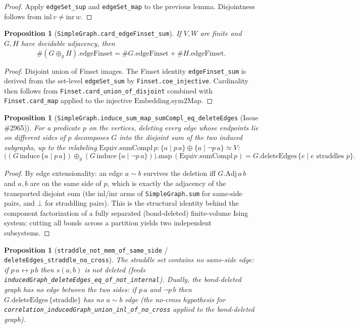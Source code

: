 \documentclass[a4paper,11pt]{article}
\newtheorem{proposition}[theorem]{Proposition}
\begin{document}
\begin{proof}
Apply \texttt{edgeSet\_sup} and \texttt{edgeSet\_map} to the previous
lemma. Disjointness follows from $\mathrm{inl}\,v \ne \mathrm{inr}\,w$.
\end{proof}

\begin{proposition}[\texttt{SimpleGraph.card\_edgeFinset\_sum}]
If $V, W$ are finite and $G, H$ have decidable adjacency, then
\[
  \#(G \oplus_g H).\mathrm{edgeFinset}
    = \#G.\mathrm{edgeFinset} + \#H.\mathrm{edgeFinset}.
\]
\end{proposition}

\begin{proof}
Disjoint union of Finset images. The Finset identity
\texttt{edgeFinset\_sum} is derived from the set-level
\texttt{edgeSet\_sum} by \texttt{Finset.coe\_injective}. Cardinality
then follows from \texttt{Finset.card\_union\_of\_disjoint} combined
with \texttt{Finset.card\_map} applied to the injective
$\mathrm{Embedding.sym2Map}$.
\end{proof}

\begin{proposition}[\texttt{SimpleGraph.induce\_sum\_map\_sumCompl\_eq\_deleteEdges} (Issue \#2965)]
For a predicate $p$ on the vertices, deleting every edge whose endpoints lie on
different sides of $p$ decomposes $G$ into the disjoint sum of the two induced
subgraphs, up to the relabeling $\mathrm{Equiv.sumCompl}\,p
: \{a\mid p\,a\}\oplus\{a\mid\neg p\,a\}\simeq V$:
\[
  \bigl((G\,\mathrm{induce}\,\{a\mid p\,a\})
    \oplus_g (G\,\mathrm{induce}\,\{a\mid\neg p\,a\})\bigr)
    .\mathrm{map}\,(\mathrm{Equiv.sumCompl}\,p)
  = G.\mathrm{deleteEdges}\,\{e\mid e\text{ straddles }p\}.
\]
\end{proposition}

\begin{proof}
By edge extensionality: an edge $a\sim b$ survives the deletion iff
$G.\mathrm{Adj}\,a\,b$ and $a,b$ are on the same side of $p$, which is exactly
the adjacency of the transported disjoint sum (the $\mathrm{inl}$/$\mathrm{inr}$
arms of \texttt{SimpleGraph.sum} for same-side pairs, and $\bot$ for straddling
pairs). This is the structural identity behind the component factorization of a
fully separated (bond-deleted) finite-volume Ising system: cutting all bonds
across a partition yields two independent subsystems.
\end{proof}

\begin{proposition}[\texttt{straddle\_not\_mem\_of\_same\_side} /
\texttt{deleteEdges\_straddle\_no\_cross}]
The straddle set contains no same-side edge: if $p\,a \leftrightarrow p\,b$ then
$s(a,b)$ is not deleted (feeds
\texttt{inducedGraph\_deleteEdges\_eq\_of\_not\_internal}). Dually, the
bond-deleted graph has no edge between the two sides: if $p\,a$ and $\neg p\,b$
then $G.\mathrm{deleteEdges}\,\{\text{straddle}\}$ has no $a\sim b$ edge (the
no-cross hypothesis for \texttt{correlation\_inducedGraph\_union\_inl\_of\_no\_cross}
applied to the bond-deleted graph).
\end{proposition}
\end{document}
